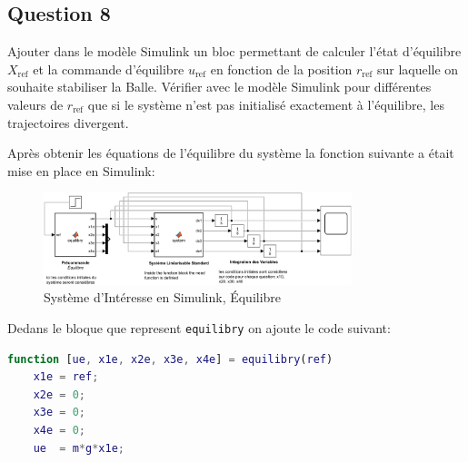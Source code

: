 \documentclass[class=article, crop=false]{standalone}
\begin{document}
\subsection{Question 8}
\begin{exercise}
    Ajouter dans le modèle Simulink un bloc permettant de calculer l'état d'équilibre $X_{\text{ref}}$ et la commande d'équilibre $u_{\text{ref}}$ en fonction de la position $r_{\text{ref}}$ sur laquelle on souhaite stabiliser la Balle. Vérifier avec le modèle Simulink pour différentes valeurs de $r_{\text{ref}}$ que si le système n'est pas initialisé exactement à l'équilibre, les trajectoires divergent.
\end{exercise}
\begin{resolution}
    Après obtenir les équations de l'équilibre du système la fonction suivante a était mise en place en Simulink:
    \begin{figure}[H]
        \centering
        \includegraphics[width = 0.8\textwidth]{../images/system_simulink_20.png}
        \caption{Système d'Intéresse en Simulink, Équilibre}
        \label{fig:simulink_system_equilibry}
    \end{figure}
    Dedans le bloque que represent \texttt{equilibry} on ajoute le code suivant:
    \begin{scriptsize}\mycode
        \begin{lstlisting}[language=Matlab]
function [ue, x1e, x2e, x3e, x4e] = equilibry(ref)
    x1e = ref;
    x2e = 0;
    x3e = 0;
    x4e = 0;
    ue  = m*g*x1e; 
        \end{lstlisting}
    \end{scriptsize}


\end{resolution}
\end{document}
